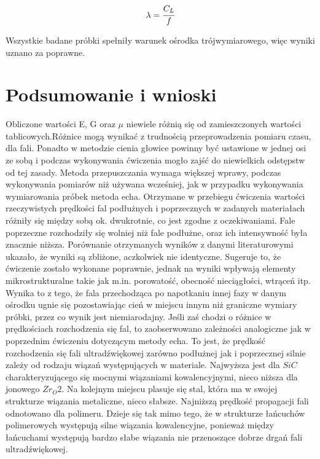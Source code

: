 \documentclass[a4paper,12pt]{article}
\begin{document}
$$\lambda=\cfrac{C_L}{f}$$



Wszystkie badane próbki spełniły warunek ośrodka trójwymiarowego, więc wyniki uznano za poprawne.



\section{Podsumowanie i wnioski}
Obliczone wartości E, G oraz $\mu$ niewiele różnią się od zamieszczonych wartości tablicowych.Różnice mogą wynikać z trudnością przeprowadzenia  pomiaru czasu, dla fali. Ponadto w metodzie cienia głowice powinny być ustawione w jednej osi ze sobą i podczas wykonywania ćwiczenia mogło zajść do niewielkich odstępstw od tej zasady. Metoda przepuszczania wymaga większej wprawy, podczas wykonywania pomiarów niż używana wcześniej, jak w przypadku wykonywania wymiarowania próbek metoda echa.
Otrzymane w przebiegu ćwiczenia wartości rzeczywistych   prędkości fal podłużnych i poprzecznych w zadanych materiałach różniły się między sobą ok. dwukrotnie, co jest zgodne z oczekiwaniami. Fale poprzeczne rozchodziły się wolniej niż fale podłużne, oraz ich intensywność była znacznie niższa. 
Porównanie otrzymanych wyników z danymi literaturowymi ukazało, że wyniki są zbliżone, aczkolwiek nie identyczne. Sugeruje to, że ćwiczenie zostało wykonane poprawnie, jednak na wyniki wpływają elementy mikrostrukturalne takie jak m.in. porowatość, obecność nieciągłości, wtrąceń itp. Wynika to z tego, że fala przechodząca po napotkaniu innej fazy w danym ośrodku ugnie się pozostawiając cień w miejscu innym niż graniczne wymiary próbki, przez co wynik jest niemiarodajny. 
Jeśli zaś chodzi o różnice w prędkościach rozchodzenia się fal, to zaobserwowano zależności analogiczne jak w poprzednim ćwiczeniu dotyczącym metody echa. To jest, że prędkość rozchodzenia się fali ultradźwiękowej zarówno podłużnej jak i poprzecznej silnie zależy od rodzaju wiązań występujących w materiale. Najwyższa jest dla $SiC$ charakteryzującego się mocnymi wiązaniami kowalencyjnymi, nieco niższa dla jonowego  $Zr_O2$. Na kolejnym miejscu plasuje się stal, która ma w swojej strukturze wiązania metaliczne, nieco słabsze. Najniższą prędkość propagacji fali odnotowano dla polimeru. Dzieje się tak mimo tego, że w strukturze łańcuchów polimerowych występują silne wiązania kowalencyjne, ponieważ między łańcuchami występują bardzo słabe wiązania nie przenoszące dobrze drgań fali ultradźwiękowej.
\end{document}
